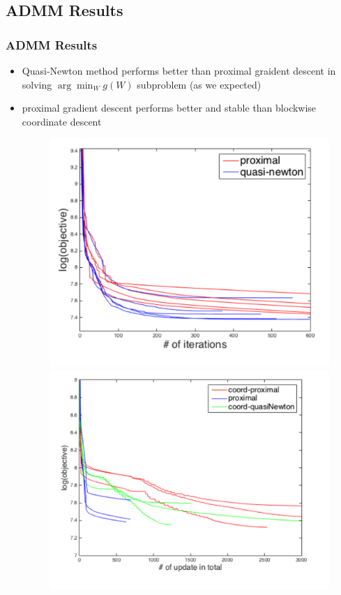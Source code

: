 \documentclass{beamer}
\begin{document}
\subsection{ADMM Results}
\begin{frame}
\frametitle{ADMM Results}
\begin{itemize}
  \item Quasi-Newton method performs better than proximal graident descent in solving $\arg\min_W g(W)$ subproblem (as we expected)
  \item proximal gradient descent performs better and stable than blockwise coordinate descent
  \begin{figure}[htbp]
  \centering
  \begin{minipage}{0.45\textwidth}
    \centering
    \includegraphics[width=1\textwidth]{images/argminW}
  \end{minipage}
  \hfill
  \begin{minipage}{0.45\textwidth}
    \centering
    \includegraphics[width=1\textwidth]{images/argminw0wW}
  \end{minipage}
  \end{figure}
\end{itemize}
\end{frame}
\end{document}
